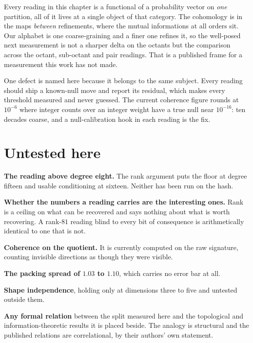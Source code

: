 Every reading in this chapter is a functional of a probability vector on \emph{one} partition, all of it lives at a single object of that category. The cohomology is in the maps \emph{between} refinements, where the mutual informations at all orders sit. Our alphabet is one coarse-graining and a finer one refines it, so the well-posed next measurement is not a sharper delta on the octants but the comparison across the octant, sub-octant and pair readings. That is a published frame for a measurement this work has not made.

One defect is named here because it belongs to the same subject. Every reading should ship a known-null move and report its residual, which makes every threshold measured and never guessed. The current coherence figure rounds at \(10^{-6}\) where integer counts over an integer weight have a true null near \(10^{-16}\): ten decades coarse, and a null-calibration hook in each reading is the fix.

\section{Untested here}

\textbf{The reading above degree eight.} The rank argument puts the floor at degree fifteen and usable conditioning at sixteen. Neither has been run on the hash.

\textbf{Whether the numbers a reading carries are the interesting ones.} Rank is a ceiling on what can be recovered and says nothing about what is worth recovering. A rank-\(81\) reading blind to every bit of consequence is arithmetically identical to one that is not.

\textbf{Coherence on the quotient.} It is currently computed on the raw signature, counting invisible directions as though they were visible.

\textbf{The packing spread of \(1.03\) to \(1.10\)}, which carries no error bar at all.

\textbf{Shape independence}, holding only at dimensions three to five and untested outside them.

\textbf{Any formal relation} between the split measured here and the topological and information-theoretic results it is placed beside. The analogy is structural and the published relations are correlational, by their authors' own statement.
